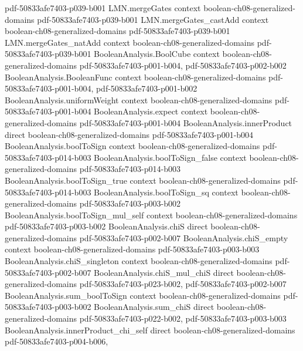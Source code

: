 \begin{theorem}
  {pdf-50833afe7403-p039-b001}
\proofstep
  {LMN.mergeGates}
  {context}
  {boolean-ch08-generalized-domains}
  {pdf-50833afe7403-p039-b001}
\proofstep
  {LMN.mergeGates_castAdd}
  {context}
  {boolean-ch08-generalized-domains}
  {pdf-50833afe7403-p039-b001}
\proofstep
  {LMN.mergeGates_natAdd}
  {context}
  {boolean-ch08-generalized-domains}
  {pdf-50833afe7403-p039-b001}
\proofstep
  {BooleanAnalysis.BoolCube}
  {context}
  {boolean-ch08-generalized-domains}
  {pdf-50833afe7403-p001-b004,
    pdf-50833afe7403-p002-b002}
\proofstep
  {BooleanAnalysis.BooleanFunc}
  {context}
  {boolean-ch08-generalized-domains}
  {pdf-50833afe7403-p001-b004,
    pdf-50833afe7403-p001-b002}
\proofstep
  {BooleanAnalysis.uniformWeight}
  {context}
  {boolean-ch08-generalized-domains}
  {pdf-50833afe7403-p001-b004}
\proofstep
  {BooleanAnalysis.expect}
  {context}
  {boolean-ch08-generalized-domains}
  {pdf-50833afe7403-p001-b004}
\proofstep
  {BooleanAnalysis.innerProduct}
  {direct}
  {boolean-ch08-generalized-domains}
  {pdf-50833afe7403-p001-b004}
\proofstep
  {BooleanAnalysis.boolToSign}
  {context}
  {boolean-ch08-generalized-domains}
  {pdf-50833afe7403-p014-b003}
\proofstep
  {BooleanAnalysis.boolToSign_false}
  {context}
  {boolean-ch08-generalized-domains}
  {pdf-50833afe7403-p014-b003}
\proofstep
  {BooleanAnalysis.boolToSign_true}
  {context}
  {boolean-ch08-generalized-domains}
  {pdf-50833afe7403-p014-b003}
\proofstep
  {BooleanAnalysis.boolToSign_sq}
  {context}
  {boolean-ch08-generalized-domains}
  {pdf-50833afe7403-p003-b002}
\proofstep
  {BooleanAnalysis.boolToSign_mul_self}
  {context}
  {boolean-ch08-generalized-domains}
  {pdf-50833afe7403-p003-b002}
\proofstep
  {BooleanAnalysis.chiS}
  {direct}
  {boolean-ch08-generalized-domains}
  {pdf-50833afe7403-p002-b007}
\proofstep
  {BooleanAnalysis.chiS_empty}
  {context}
  {boolean-ch08-generalized-domains}
  {pdf-50833afe7403-p003-b003}
\proofstep
  {BooleanAnalysis.chiS_singleton}
  {context}
  {boolean-ch08-generalized-domains}
  {pdf-50833afe7403-p002-b007}
\proofstep
  {BooleanAnalysis.chiS_mul_chiS}
  {direct}
  {boolean-ch08-generalized-domains}
  {pdf-50833afe7403-p023-b002,
    pdf-50833afe7403-p002-b007}
\proofstep
  {BooleanAnalysis.sum_boolToSign}
  {context}
  {boolean-ch08-generalized-domains}
  {pdf-50833afe7403-p003-b002}
\proofstep
  {BooleanAnalysis.sum_chiS}
  {direct}
  {boolean-ch08-generalized-domains}
  {pdf-50833afe7403-p022-b002,
    pdf-50833afe7403-p003-b003}
\proofstep
  {BooleanAnalysis.innerProduct_chi_self}
  {direct}
  {boolean-ch08-generalized-domains}
  {pdf-50833afe7403-p004-b006,
}
\end{theorem}
